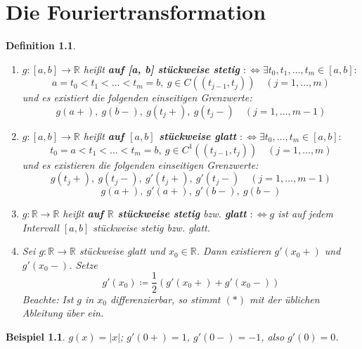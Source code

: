 \documentclass[12pt]{extreport} %
\newcommand{\R}{\mathbb{R}}
\theoremstyle{named}
\theoremstyle{nnamed}
\theoremstyle{itshape}
\newtheorem*{definition}{Definition}
\theoremstyle{normal}
\newtheorem*{beispiel*}{Beispiel}
\begin{document}
\chapter{Die Fouriertransformation}

  
\begin{definition} ~\
	\begin{enumerate}
		\item $g \colon [a, b] \rightarrow \R$ hei{\ss}t \textbf{auf [a, b] stückweise stetig} $:\iff \exists t_{0}, t_{1}, \dotsc, t_{m} \in [a, b]:$
			$$ a = t_{0} < t_{1} < \dotsc < t_{m} = b, ~g \in C\left( (t_{j-1}, t_{j}) \right) \quad (j = 1, \dotsc, m)  $$
			und es existiert die folgenden einseitigen Grenzwerte:
			$$ g(a+), ~ g(b-), ~ g(t_{j}+), ~g(t_{j}-) \quad (j = 1, \dotsc, m-1) $$ %
		\item $g \colon [a, b] \rightarrow \R$ hei{\ss}t \textbf{auf $[a, b]$ stückweise glatt} $:\iff \exists t_{0}, \dotsc, t_{m} \in [a, b]:$
			$$ t_{0} = a < t_{1} < \dotsc < t_{m} = b, ~g \in C^{1}\left( (t_{j-1}, t_{j}) \right) \quad (j = 1, \dotsc, m) $$
			und es existieren die folgenden einseitigen Grenzwerte:
			$$ g(t_{j}+), ~ g(t_{j}-), ~g'(t_{j}+), ~g'(t_{j}-) \quad (j =1, \dotsc, m-1) $$
			$$ g(a+), ~g'(a+), ~g'(b-), ~g(b-) $$
		\item $g \colon \R \rightarrow \R$ hei{\ss}t \textbf{auf $\R$ stückweise stetig} bzw. \textbf{glatt} $:\iff g$ ist auf jedem Intervall $[a, b]$ stückweise stetig bzw. glatt.
		\item Sei $g \colon \R \rightarrow \R$ stückweise glatt und $x_{0} \in \R$. Dann existieren $g'(x_{0}+)$ und $g'(x_{0}-)$. Setze
			\begin{equation*}
				g'(x_{0}) \coloneqq \frac{1}{2} \left( g'(x_{0}+) + g'(x_{0}-) \right)  \tag*{$(*)$}
			\end{equation*}
			Beachte: Ist $g$ in $x_{0}$ differenzierbar, so stimmt $(*)$ mit der üblichen Ableitung über ein.
	\end{enumerate}
\end{definition}


\begin{beispiel*}
	$g(x) = |x|$; $g'(0+) = 1$, $g'(0-) = -1$, also $g'(0) = 0$.	
\end{beispiel*}
\end{document}
